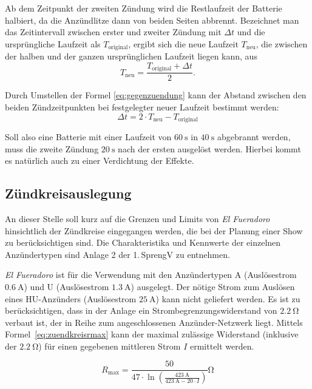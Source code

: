 \documentclass[paper=a4, parskip, numbers=noenddot, toc=listof, headsepline]{scrbook}
\newcommand{\anlage}{\emph{El Fueradoro}}
\begin{document}
				Ab dem Zeitpunkt der zweiten Zündung wird die Restlaufzeit der Batterie halbiert, da die Anzündlitze dann von beiden Seiten abbrennt. Bezeichnet man das Zeitintervall zwischen erster und zweiter Zündung mit ${\Delta}t$ und die ursprüngliche Laufzeit als $T_\text{original}$, ergibt sich die neue Laufzeit $T_\text{neu}$, die zwischen der halben und der ganzen ursprünglichen Laufzeit liegen kann, aus
				\begin{equation}
					T_\text{neu} = \frac{T_\text{original} + {\Delta}t}{2}.
					\label{eq:gegenzuendung}
				\end{equation}

				Durch Umstellen der Formel \eqref{eq:gegenzuendung} kann der Abstand zwischen den beiden Zündzeitpunkten bei festgelegter neuer Laufzeit bestimmt werden:
				\begin{equation}
					{\Delta}t = 2 {\cdot} T_\text{neu} - T_\text{original}
				\end{equation}

				Soll also eine Batterie mit einer Laufzeit von $\SI{60}{\second}$ in $\SI{40}{\second}$ abgebrannt werden, muss die zweite Zündung $\SI{20}{\second}$ nach der ersten ausgelöst werden. Hierbei kommt es natürlich auch zu einer Verdichtung der Effekte.

			\subsection{Zündkreisauslegung}

				An dieser Stelle soll kurz auf die Grenzen und Limits von {\anlage} hinsichtlich der Zündkreise eingegangen werden, die bei der Planung einer Show zu berücksichtigen sind. Die Charakteristika und Kennwerte der einzelnen Anzündertypen sind Anlage 2 der 1.\,SprengV zu entnehmen.

					{\anlage} ist für die Verwendung mit den Anzündertypen A (Auslösestrom $\SI{0,6}{\ampere}$) und U (Auslösestrom $\SI{1,3}{\ampere}$) ausgelegt. Der nötige Strom zum Auslösen eines HU-Anzünders (Auslösestrom $\SI{25}{\ampere}$) kann nicht geliefert werden. Es ist zu berücksichtigen, dass in der Anlage ein Strombegrenzungswiderstand von $\SI{2,2}{\ohm}$ verbaut ist, der in Reihe zum angeschlossenen Anzünder-Netzwerk liegt. Mittels Formel~\eqref{eq:zuendkreisrmax} kann der maximal zulässige Widerstand (inklusive der $\SI{2,2}{\ohm}$) für einen gegebenen mittleren Strom $I$ ermittelt werden.

				\begin{equation}
					R_\text{max} = \frac{50}{47 {\cdot} \ln\left(\frac{\SI{423}{\ampere}}{\SI{423}{\ampere} - 20 {\cdot} I}\right)}\si{\ohm}
					\label{eq:zuendkreisrmax}
				\end{equation}
\end{document}
